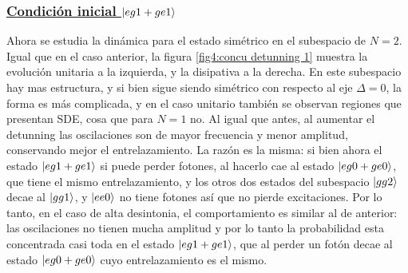\subsubsection{\underline{Condición inicial $\ket{eg1+ge1}$}}
Ahora se estudia la dinámica para el estado simétrico en el subespacio de $N=2$. Igual que en el caso anterior, la figura \ref{fig4:concu detunning 1} muestra la evolución unitaria a la izquierda, y la disipativa a la derecha. En este subespacio hay mas estructura, y si bien sigue siendo simétrico con respecto al eje $\Delta=0$, la forma es más complicada, y en el caso unitario también se observan regiones que presentan SDE, cosa que para $N=1$ no. Al igual que antes, al aumentar el detunning las oscilaciones son de mayor frecuencia y menor amplitud, conservando mejor el entrelazamiento. La razón es la misma: si bien ahora el estado $\ket{eg1+ge1}$ si puede perder fotones, al hacerlo cae al estado $\ket{eg0+ge0}$, que tiene el mismo entrelazamiento, y los otros dos estados del subespacio $\ket{gg2}$ decae al $\ket{gg1}$, y $\ket{ee0}$ no tiene fotones así que no pierde excitaciones. Por lo tanto, en el caso de alta desintonia, el comportamiento es similar al de anterior: las oscilaciones no tienen mucha amplitud y por lo tanto la probabilidad esta concentrada casi toda en el estado $\ket{eg1+ge1}$, que al perder un fotón decae al estado $\ket{eg0+ge0}$ cuyo entrelazamiento es el mismo.
